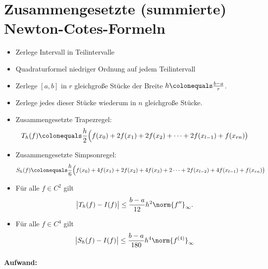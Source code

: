 \section{Zusammengesetzte (summierte) Newton-Cotes-Formeln}
\begin{itemize}
\item Zerlege Intervall in Teilintervalle
\item Quadraturformel niedriger Ordnung auf jedem Teilintervall
\item Zerlege $[a,b]$ in $r$ gleichgroße Stücke der Breite $h \colonequals \frac{b-a}{r}$.
\item Zerlege jedes dieser Stücke wiederum in $n$ gleichgroße Stücke.
\item Zusammengesetzte Trapezregel:
\begin{equation*}
T_h(f) \colonequals \frac{h}{2} \Big(f(x_0) + 2f(x_1) + 2f(x_2) +  \dots + 2f(x_{l-1}) + f(x_{rn}) \big)
\end{equation*}
\item Zusammengesetzte Simpsonregel:
\begin{equation*}
S_h(f) \colonequals \frac{h}{6} \Big(f(x_0) + 4f(x_1) + 2f(x_2) + 4f(x_3) + 2 \dots + 2f(x_{l-2})  + 4f(x_{l-1}) + f(x_{rn}) \big)
\end{equation*}
\end{itemize}

\begin{satz}\mbox{}
\begin{itemize}
\item Für alle $f \in C^2$ gilt
\begin{equation*}
\big\vert T_h(f) - I(f) \big \vert \le \frac{b-a}{12} h^2 \norm{f''}_\infty.
\end{equation*}
\item Für alle $f \in C^4$ gilt
\begin{equation*}
\big\vert S_h(f) - I(f) \big \vert \le \frac{b-a}{180} h^4 \norm{f^{(4)}}_\infty
\end{equation*}
\end{itemize}
\end{satz}

\paragraph{Aufwand:}

